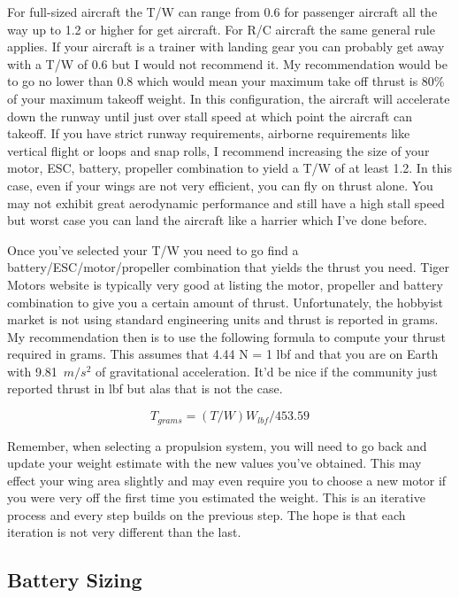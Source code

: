For full-sized aircraft the T/W can range from 0.6 for passenger
aircraft all the way up to 1.2 or higher for get aircraft. For R/C
aircraft the same general rule applies. If your aircraft is a trainer
with landing gear you can probably get away with a T/W of 0.6 but I
would not recommend it. My recommendation would be to go no lower than
0.8 which would mean your maximum take off thrust is 80\% of your
maximum takeoff weight. In this configuration, the aircraft will
accelerate down the runway until just over stall speed at which point
the aircraft can takeoff. If you have strict runway requirements,
airborne requirements like vertical flight or loops and snap rolls, I
recommend increasing the size of your motor, ESC, battery, propeller
combination to yield a T/W of at least 1.2. In this case, even if your
wings are not very efficient, you can fly on thrust alone. You may not
exhibit great aerodynamic performance and still have a high stall
speed but worst case you can land the aircraft like a harrier which
I've done before.

Once you've selected your T/W you need to go find a
battery/ESC/motor/propeller combination that yields the thrust you
need. Tiger Motors website is typically very good at listing the
motor, propeller and battery combination to give you a certain amount
of thrust. Unfortunately, the hobbyist market is not using standard
engineering units and thrust is reported in grams. My recommendation
then is to use the following formula to compute your thrust required
in grams. This assumes that 4.44 N = 1 lbf and that you are on Earth
with 9.81~$m/s^2$ of gravitational acceleration. It'd be nice if the
community just reported thrust in lbf but alas that is not the case. 

\begin{equation}
T_{grams} = (T/W)W_{lbf}/453.59
\end{equation}

Remember, when selecting a propulsion system, you will need to go back
and update your weight estimate with the new values you've
obtained. This may effect your wing area slightly and may even require
you to choose a new motor if you were very off the first time you
estimated the weight. This is an iterative process and every step
builds on the previous step. The hope is that each iteration is not
very different than the last.

\subsection{Battery Sizing}

